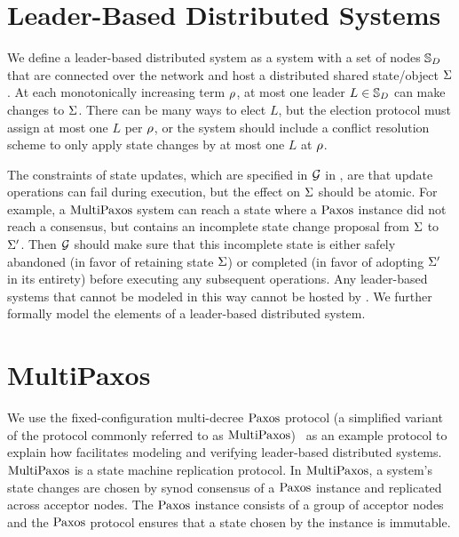 \section{Leader-Based Distributed Systems}
\label{chapter:witnesspassing:sec:leader-based-distributed-systems}

We define a leader-based distributed system as a system with a set of nodes
$\mathbb{S}_{D}$ that are connected over the network and host a distributed shared state/object
$\Sigma$. At each monotonically increasing term $\rho$, at most one leader
$L \in \mathbb{S}_{D}$ can make changes to $\Sigma$. There can be many ways to elect
$L$, but the election protocol must assign at most one $L$ per $\rho$,
or the system should include a conflict resolution scheme to only apply
state changes by at most one $L$ at $\rho$.

The constraints of state updates, which are specified in $\mathcal{G}$ in \sysname{},
are that
update operations can fail during execution, but the effect on $\Sigma$ should be
atomic. For example, a $\mathrm{MultiPaxos}$ system can reach a
state where a $\mathrm{Paxos}$ instance did not reach a consensus, but contains an
incomplete state change proposal from $\Sigma$ to $\Sigma^\prime$.
Then $\mathcal{G}$ should make sure that this
incomplete state is either safely abandoned (in favor of retaining state $\Sigma$)
or completed (in favor of adopting $\Sigma^\prime$ in its entirety)
before executing any subsequent
operations. Any leader-based systems that cannot be modeled in this way cannot
be hosted by \sysname{}.
We further formally model the elements of a leader-based distributed system.

\section{MultiPaxos}
\label{chapter:witnesspassing:multipaxos}

We use the fixed-configuration multi-decree $\mathrm{Paxos}$ protocol (a simplified variant
of the protocol commonly referred to as $\mathrm{MultiPaxos}$)~\cite{rvrpaxos}
as an example protocol to explain how \sysname{} facilitates modeling and
verifying leader-based distributed systems. $\mathrm{MultiPaxos}$ is a
state machine replication protocol. In $\mathrm{MultiPaxos}$, a system's state changes
are chosen by synod consensus of a $\mathrm{Paxos}$ instance and replicated across acceptor nodes.
The $\mathrm{Paxos}$ instance consists of a group of acceptor nodes and the $\mathrm{Paxos}$ protocol
ensures that a state chosen by the instance is immutable.


